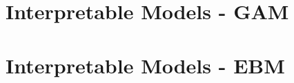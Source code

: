 \documentclass[11pt,compress,t,n
otes=noshow, aspectratio=169, xcolor=table]{beamer}
\begin{document}


%
%
%

\section{Interpretable Models - GAM}

%

\section{Interpretable Models - EBM}

\end{document}
